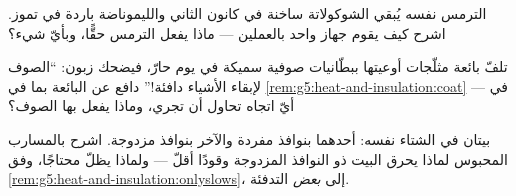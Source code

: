 \begin{exercise}[$\star\star$]\label{exo:g5:heat-and-insulation:9}
الترمس نفسه يُبقي الشوكولاتة ساخنة في كانون الثاني والليموناضة
باردة في تموز. اشرح كيف يقوم جهاز واحد بالعملين --- ماذا يفعل
الترمس حقًّا، وبأيّ شيء؟
\end{exercise}

\begin{exercise}[$\star\star$]\label{exo:g5:heat-and-insulation:10}
تلفّ بائعة مثلّجات أوعيتها ببطّانيات صوفية سميكة في يوم حارّ،
فيضحك زبون: ``الصوف لإبقاء الأشياء دافئة!'' دافع عن البائعة بما
في \cref{rem:g5:heat-and-insulation:coat} --- في أيّ اتجاه
تحاول  أن تجري، وماذا يفعل بها الصوف؟
\end{exercise}

\begin{exercise}[$\star\star$]\label{exo:g5:heat-and-insulation:11}
بيتان في الشتاء نفسه: أحدهما بنوافذ مفردة والآخر بنوافذ مزدوجة.
اشرح بالمسارب  المحبوس لماذا يحرق البيت ذو النوافذ
المزدوجة وقودًا أقلّ --- ولماذا يظلّ محتاجًا، وفق
\cref{rem:g5:heat-and-insulation:onlyslows}، إلى \emph{بعض}
التدفئة.
\end{exercise}
